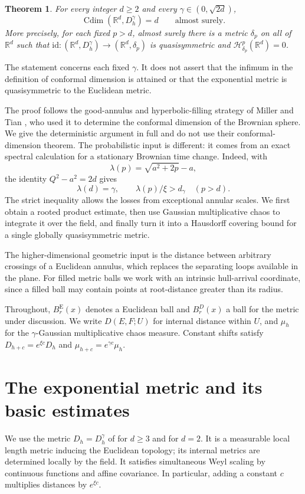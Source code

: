 \documentclass[11pt,reqno]{amsart}
\theoremstyle{plain}
\newtheorem{theorem}{Theorem}[section]
\theoremstyle{definition}
\theoremstyle{remark}
\newcommand{\R}{\mathbb R}
\newcommand{\Hh}{\mathcal H}
\newcommand{\Cdim}{\operatorname{Cdim}}
\newcommand{\1}{\mathbf{1}}
\newcommand{\Be}{B^{\mathrm E}}
\newcommand{\bd}{B^{D}}
\begin{document}
\begin{theorem}\label{thm:main}
For every integer $d\ge2$ and every $\gamma\in(0,\sqrt{2d})$,
\begin{equation}\label{eq:main}
\Cdim(\R^d,D_h^\gamma)=d\qquad\text{almost surely}.
\end{equation}
More precisely, for each fixed $p>d$, almost surely there is a metric $\delta_p$ on all of $\R^d$ such that $\mathrm{id}:(\R^d,D_h^\gamma)\to(\R^d,\delta_p)$ is quasisymmetric and $\Hh^p_{\delta_p}(\R^d)=0$.
\end{theorem}
The statement concerns each fixed $\gamma$. It does not assert that the infimum in the definition of conformal dimension is attained or that the exponential metric is quasisymmetric to the Euclidean metric.

The proof follows the good-annulus and hyperbolic-filling strategy of Miller and Tian \cite[Sections 5--6]{MT}, who used it to determine the conformal dimension of the Brownian sphere. We give the deterministic argument in full and do not use their conformal-dimension theorem. The probabilistic input is different: it comes from an exact spectral calculation for a stationary Brownian time change. Indeed, with
\begin{equation}\label{eq:key-exponent}
\lambda(p)=\sqrt{a^2+2p}-a,
\end{equation}
the identity $Q^2-a^2=2d$ gives
\[
\lambda(d)=\gamma,\qquad \lambda(p)/\xi>d_\gamma\quad (p>d).
\]
The strict inequality allows the losses from exceptional annular scales. We first obtain a rooted product estimate, then use Gaussian multiplicative chaos to integrate it over the field, and finally turn it into a Hausdorff covering bound for a single globally quasisymmetric metric.

The higher-dimensional geometric input is the distance between arbitrary crossings of a Euclidean annulus, which replaces the separating loops available in the plane. For filled metric balls we work with an intrinsic hull-arrival coordinate, since a filled ball may contain points at root-distance greater than its radius.

Throughout, $\Be_r(x)$ denotes a Euclidean ball and $\bd_r(x)$ a ball for the metric under discussion. We write $D(E,F;U)$ for internal distance within $U$, and $\mu_h$ for the $\gamma$-Gaussian multiplicative chaos measure. Constant shifts satisfy $D_{h+c}=e^{\xi c}D_h$ and $\mu_{h+c}=e^{\gamma c}\mu_h$.

\section{The exponential metric and its basic estimates}\label{sec:inputs}
We use the metric $D_h=D_h^\gamma$ of \cite{Bonanno} for $d\ge3$ and \cite{GM} for $d=2$. It is a measurable local length metric inducing the Euclidean topology; its internal metrics are determined locally by the field. It satisfies simultaneous Weyl scaling by continuous functions and affine covariance. In particular, adding a constant $c$ multiplies distances by $e^{\xi c}$.
\end{document}
